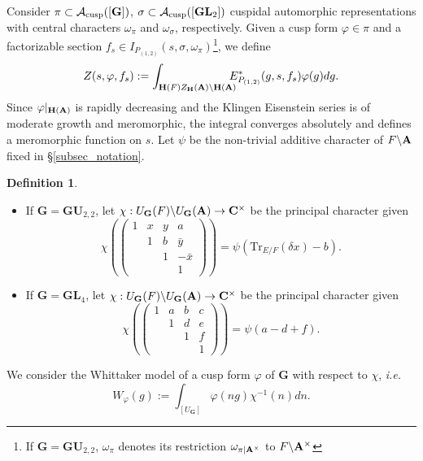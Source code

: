\documentclass[11pt, reqno]{amsart}
\theoremstyle{plain}
\theoremstyle{definition}
\newtheorem{definition}[theorem]{Definition}
\theoremstyle{remark}
\theoremstyle{plain}
\def\C{{\bf C}}
\def\H{{H}}
\def\A{{\bf A}}
\def\G{\mathbf{G}}
\def\H{\mathbf{H}}
\def\GU{{\mathbf{GU}}}
\def\GL{\mathbf{GL}}
\begin{document}
Consider $\pi \subset \mathcal{A}_{\rm cusp}([\G])$,  $ \sigma \subset \mathcal{A}_{\rm cusp}([\GL_2])$ cuspidal automorphic representations with central characters $\omega_{\pi}$ and $\omega_{\sigma}$, respectively. Given a cusp form $\varphi \in \pi$ and a factorizable section $f_s \in I_{P_{(1,2)}}(s,\sigma,\omega_{\pi})$\footnote{ If $\G = \GU_{2,2}$, $\omega_{\pi}$ denotes its restriction ${\omega_{\pi| \A^\times}}$ to $F\backslash \A^\times$}, we define
\[Z(s,\varphi,f_s) := \int_{\H(F) Z_\H(\A)\setminus \H(\A)} \!\!\!\!\!E^*_{P_{(1,2)}}(g,s, f_s)\varphi(g)dg.\]
Since $\varphi|_{\H(\A)}$ is rapidly decreasing and the Klingen Eisenstein series is of moderate growth and meromorphic, the integral converges absolutely and defines a meromorphic function on $s$. Let $\psi$ be the non-trivial additive character of $F \backslash \A$ fixed in \S \ref{subsec_notation}.

\begin{definition} \label{def:principal:character} \leavevmode \begin{itemize}
    \item If $\G = \GU_{2,2}$, let $\chi :U_{\G}(F) \backslash U_{\G}(\A) \to\C^{\times}$  be the principal character given $$\chi\left(\left(\begin{smallmatrix} 1 & x & y & a\\ & 1 & b & \bar{ y} \\ & & 1 & - \bar{x} \\ & & & 1\end{smallmatrix} \right)\right) = \psi(\mathrm{Tr}_{E/F}(\delta x) - b).$$
    \item If $\G = \GL_4$, let $\chi :U_{\G}(F) \backslash U_{\G}(\A) \to\C^{\times}$  be the principal character given $$\chi\left(\left(\begin{smallmatrix} 1 & a & b & c\\ & 1 & d & e \\ & & 1 & f \\ & & & 1\end{smallmatrix} \right)\right) = \psi(a - d + f).$$
    \end{itemize} 
\end{definition} 
We consider the Whittaker model of a cusp form $\varphi$ of $\G$ with respect to $\chi$, \textit{i.e.}
\[W_{\varphi}(g) := \int_{[U_{\G}]}\varphi(ng)\chi^{-1}(n)dn.\]
\end{document}
